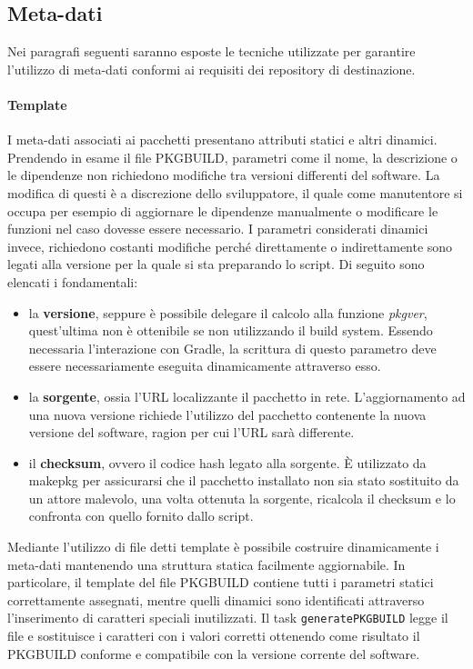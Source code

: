

\subsection{Meta-dati}

Nei paragrafi seguenti saranno esposte le tecniche utilizzate per garantire l'utilizzo di meta-dati conformi ai requisiti dei repository di destinazione.

\paragraph{Template} I meta-dati associati ai pacchetti presentano attributi statici e altri dinamici. Prendendo in esame il file PKGBUILD, parametri come il nome, la descrizione o le dipendenze non richiedono modifiche tra versioni differenti del software. La modifica di questi è a discrezione dello sviluppatore, il quale come manutentore si occupa per esempio di aggiornare le dipendenze manualmente o modificare le funzioni nel caso dovesse essere necessario. I parametri considerati dinamici invece, richiedono costanti modifiche perché direttamente o indirettamente sono legati alla versione per la quale si sta preparando lo script. Di seguito sono elencati i fondamentali:
\begin{itemize}
	\item la \textbf{versione}, seppure è possibile delegare il calcolo alla funzione \textit{pkgver}, quest'ultima non è ottenibile se non utilizzando il build system. Essendo necessaria l'interazione con Gradle, la scrittura di questo parametro deve essere necessariamente eseguita dinamicamente attraverso esso.
	\item la \textbf{sorgente}, ossia l'URL localizzante il pacchetto in rete. L'aggiornamento ad una nuova versione richiede l'utilizzo del pacchetto contenente la nuova versione del software, ragion per cui l'URL sarà differente.
	\item il \textbf{checksum}, ovvero il codice hash legato alla sorgente. È utilizzato da makepkg per assicurarsi che il pacchetto installato non sia stato sostituito da un attore malevolo, una volta ottenuta la sorgente, ricalcola il checksum e lo confronta con quello fornito dallo script.
\end{itemize}
Mediante l'utilizzo di file detti template è possibile costruire dinamicamente i meta-dati mantenendo una struttura statica facilmente aggiornabile. In particolare, il template del file PKGBUILD contiene tutti i parametri statici correttamente assegnati, mentre quelli dinamici sono identificati attraverso l'inserimento di caratteri speciali inutilizzati. Il task \texttt{generatePKGBUILD} legge il file e sostituisce i caratteri con i valori corretti ottenendo come risultato il PKGBUILD conforme e compatibile con la versione corrente del software.

